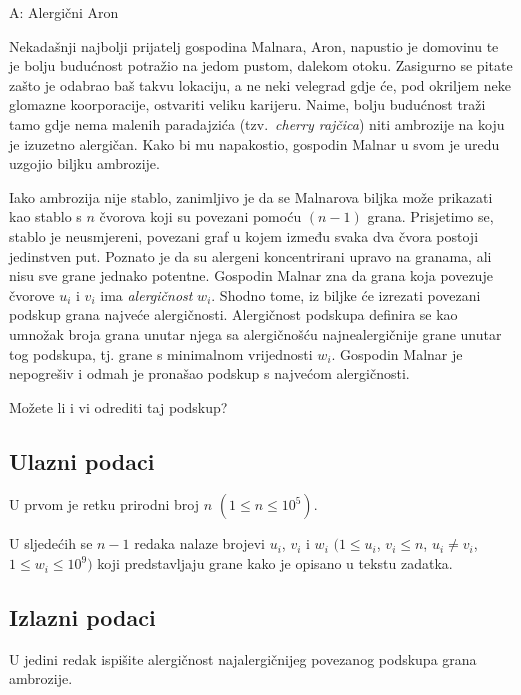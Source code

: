 \begin{statement}[
  timelimit=1 s,
  memorylimit=512 MiB,
]{A: Alergični Aron}

Nekadašnji najbolji prijatelj gospodina Malnara, Aron, napustio je domovinu te
je bolju budućnost potražio na jedom pustom, dalekom otoku. Zasigurno se pitate
zašto je odabrao baš takvu lokaciju, a ne neki velegrad gdje će, pod okriljem
neke glomazne koorporacije, ostvariti veliku karijeru. Naime, bolju budućnost
traži tamo gdje nema malenih paradajzića (tzv.\ \textit{cherry rajčica}) niti
ambrozije na koju je izuzetno alergičan. Kako bi mu napakostio, gospodin Malnar
u svom je uredu uzgojio biljku ambrozije.

Iako ambrozija nije stablo, zanimljivo je da se Malnarova biljka može prikazati
kao stablo s $n$ čvorova koji su povezani pomoću $(n-1)$ grana. Prisjetimo se,
stablo je neusmjereni, povezani graf u kojem između svaka dva čvora postoji
jedinstven put. Poznato je da su
alergeni koncentrirani upravo na granama, ali nisu sve grane jednako potentne.
Gospodin Malnar zna da grana koja povezuje čvorove $u_i$ i $v_i$ ima
\textit{alergičnost} $w_i$. Shodno tome, iz biljke će izrezati povezani podskup
grana najveće alergičnosti. Alergičnost podskupa definira se kao umnožak broja
grana unutar njega sa alergičnošću najnealergičnije grane unutar tog podskupa,
tj. grane s minimalnom vrijednosti $w_i$. Gospodin Malnar je nepogrešiv i odmah
je pronašao podskup s najvećom alergičnosti.

Možete li i vi odrediti taj podskup?

\subsection*{Ulazni podaci}
U prvom je retku prirodni broj $n$ $(1 \le n \le 10^5)$.

U sljedećih se $n-1$ redaka nalaze brojevi $u_i$, $v_i$ i $w_i$
$(1 \le u_i$, $v_i \le n$, $u_i \neq v_i$, $1 \le w_i \le 10^9)$ koji
predstavljaju grane kako je opisano u tekstu zadatka.

\subsection*{Izlazni podaci}
U jedini redak ispišite alergičnost najalergičnijeg povezanog podskupa
grana ambrozije.


\end{statement}

